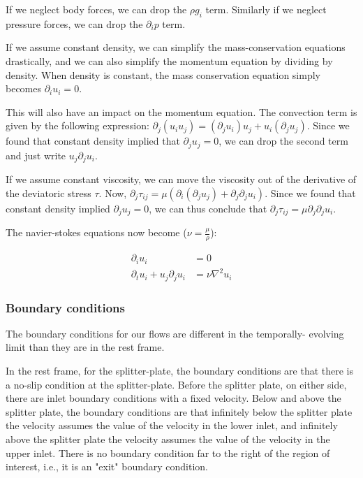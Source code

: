 \documentclass{article}
\begin{document}
If we neglect body forces, we can drop the $\rho g_i$ term.
Similarly if we neglect pressure forces, we can drop the $\partial_i p$ term.

If we assume constant density, we can simplify the mass-conservation
	equations drastically, and we can also simplify the momentum 
	equation by dividing by density. 
When density is constant, the mass conservation equation simply becomes
	$\partial_i u_i = 0$.

This will also have an impact on the momentum equation. 
The convection term is given by the following expression:
	$\partial_j \left( u_i u_j \right) =
	\left( \partial_j u_i \right) u_j 
	+ u_i \left( \partial_j u_j \right)$.
Since we found that constant density implied that $\partial_j u_j = 0$,
	we can drop the second term and just write $u_j \partial_j u_i$.

If we assume constant viscosity, we can move the viscosity out of the 
	derivative of the deviatoric stress $\tau$.
Now, $\partial_j \tau_{ij} = \mu \left( \partial_i 
	\left( \partial_j u_j \right) + \partial_j \partial_j u_i \right)$.
Since we found that constant density implied $\partial_j u_j = 0$,
	we can thus conclude that $\partial_j \tau_{ij} 
	= \mu \partial_j \partial_j u_i$.

The navier-stokes equations now become ($\nu = \frac{\mu}{\rho}$):

\begin{align}
\partial_i u_i & = 0 \\
\partial_t u_i + u_j \partial_j u_i & = \nu \nabla^2 u_i
\end{align}

\subsubsection{Boundary conditions}

The boundary conditions for our flows are different in the temporally-
	evolving limit than they are in the rest frame.

In the rest frame, for the splitter-plate, the boundary conditions are that
	there is a no-slip condition at the splitter-plate.
Before the splitter plate, on either side, there are inlet boundary
	conditions with a fixed velocity.
Below and above the splitter plate, the boundary conditions are that
	infinitely below the splitter plate the velocity
	assumes the value of the velocity in the lower inlet,
	and infinitely above the splitter plate the velocity
	assumes the value of the velocity in the upper inlet.
There is no boundary condition far to the right of the region of interest,
	i.e., it is an "exit" boundary condition.
\end{document}
